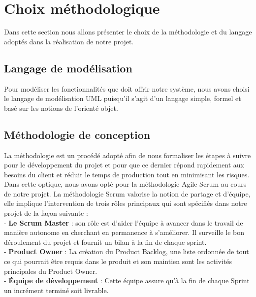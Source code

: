 \section{Choix méthodologique}
Dans cette section nous allons présenter le choix de la méthodologie et du langage adoptés dans la réalisation de notre projet.
\newpage
\subsection{Langage de modélisation}
Pour modéliser les fonctionnalités que doit offrir notre système, nous avons choisi le langage de modélisation UML puisqu'il s’agit d’un langage simple, formel et basé sur les notions de l’orienté objet.
\subsection{Méthodologie de conception}
La méthodologie est un procédé adopté afin de nous formaliser les étapes à suivre pour le développement du projet et pour que ce dernier répond rapidement aux besoins du client et réduit le  temps de production tout en minimisant les risques.\\
Dans cette optique, nous avons opté pour la méthodologie Agile Scrum au cours de notre projet.
La méthodologie Scrum valorise la notion de partage et d’équipe, elle implique l’intervention de trois rôles principaux qui sont spécifiés dans notre projet de la façon suivante :\\
- \textbf {Le Scrum Master }: son rôle est d'aider l'équipe à avancer dans le travail de manière autonome en cherchant en permanence à s’améliorer. Il surveille le bon déroulement du
projet et fournit un bilan à la fin de chaque sprint.\\
- \textbf {Product Owner }: La création du Product Backlog, une liste ordonnée de tout ce qui pourrait être requis dans le produit et son maintien sont les activités principales du Product Owner.\\ 
- \textbf {Équipe de développement }: Cette équipe assure qu'à la fin de chaque Sprint un incrément terminé soit livrable.
